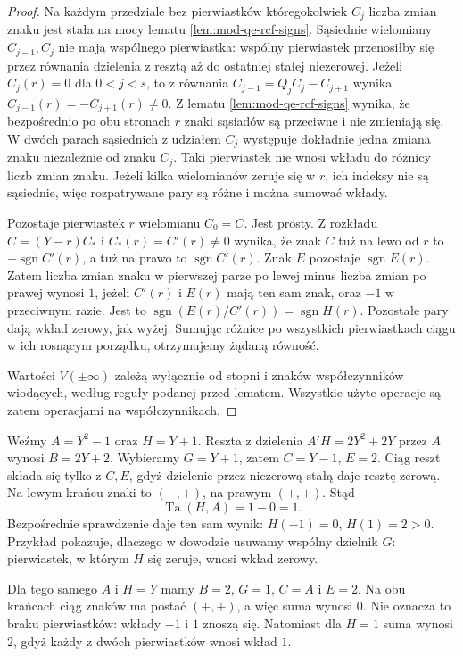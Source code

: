 \begin{proof}
Na każdym przedziale bez pierwiastków któregokolwiek
$C_j$ liczba zmian znaku jest stała na mocy lematu
\ref{lem:mod-qe-rcf-signs}.
Sąsiednie wielomiany $C_{j-1},C_j$ nie mają wspólnego
pierwiastka: wspólny pierwiastek przenosiłby się
przez równania dzielenia z resztą aż do ostatniej
stałej niezerowej. Jeżeli $C_j(r)=0$ dla $0<j<s$,
to z równania
$C_{j-1}=Q_jC_j-C_{j+1}$ wynika
$C_{j-1}(r)=-C_{j+1}(r)\ne0$.
Z lematu \ref{lem:mod-qe-rcf-signs} wynika, że
bezpośrednio po obu stronach $r$ znaki sąsiadów
są przeciwne i nie zmieniają się. W dwóch
parach sąsiednich z udziałem $C_j$ występuje
dokładnie jedna zmiana znaku niezależnie od znaku
$C_j$. Taki pierwiastek nie wnosi wkładu do różnicy
liczb zmian znaku. Jeżeli kilka wielomianów zeruje
się w $r$, ich indeksy nie są sąsiednie, więc
rozpatrywane pary są różne i można sumować wkłady.

Pozostaje pierwiastek $r$ wielomianu $C_0=C$.
Jest prosty. Z rozkładu $C=(Y-r)C_*$ i
$C_*(r)=C'(r)\ne0$ wynika, że znak $C$ tuż na lewo
od $r$ to $-\operatorname{sgn}C'(r)$, a tuż na prawo
to $\operatorname{sgn}C'(r)$. Znak $E$ pozostaje
$\operatorname{sgn}E(r)$. Zatem liczba zmian znaku
w pierwszej parze po lewej minus liczba zmian
po prawej wynosi $1$, jeżeli $C'(r)$ i $E(r)$ mają
ten sam znak, oraz $-1$ w przeciwnym razie.
Jest to $\operatorname{sgn}(E(r)/C'(r))
=\operatorname{sgn}H(r)$.
Pozostałe pary dają wkład zerowy, jak wyżej.
Sumując różnice po wszystkich pierwiastkach ciągu
w ich rosnącym porządku, otrzymujemy żądaną równość.

Wartości $V(\pm\infty)$ zależą wyłącznie od stopni
i znaków współczynników wiodących, według reguły
podanej przed lematem. Wszystkie użyte operacje
są zatem operacjami na współczynnikach.
\end{proof}

\begin{przyklad}
\label{ex:mod-qe-sturm-tarski}
Weźmy $A=Y^2-1$ oraz $H=Y+1$.
Reszta z dzielenia $A'H=2Y^2+2Y$ przez $A$ wynosi
$B=2Y+2$. Wybieramy $G=Y+1$, zatem
$C=Y-1$, $E=2$. Ciąg reszt składa się tylko z $C,E$,
gdyż dzielenie przez niezerową stałą daje resztę
zerową. Na lewym krańcu znaki to $(-,+)$, na prawym
$(+,+)$. Stąd
\[
\operatorname{Ta}(H,A)=1-0=1.
\]
Bezpośrednie sprawdzenie daje ten sam wynik:
$H(-1)=0$, $H(1)=2>0$. Przykład pokazuje, dlaczego
w dowodzie usuwamy wspólny dzielnik $G$: pierwiastek,
w którym $H$ się zeruje, wnosi wkład zerowy.

Dla tego samego $A$ i $H=Y$ mamy $B=2$, $G=1$,
$C=A$ i $E=2$. Na obu krańcach ciąg znaków ma
postać $(+,+)$, a więc suma wynosi $0$.
Nie oznacza to braku pierwiastków: wkłady $-1$ i $1$
znoszą się. Natomiast dla $H=1$ suma wynosi $2$,
gdyż każdy z dwóch pierwiastków wnosi wkład $1$.
\end{przyklad}

